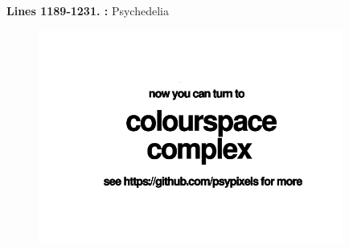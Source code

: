 \textbf{Lines 1189-1231. :} Psychedelia
\clearpage

\vspace*{\fill}
\begin{figure}[H]
    \centering
      \includegraphics[width=10cm]{src/cover/title_page_colorspace_coming_soon.png}%
\end{figure}

\vspace*{\fill}
